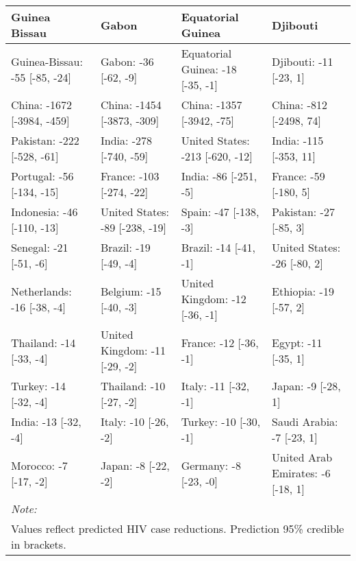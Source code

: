 \begin{table}
\centering
\begin{tabular}[t]{llll}
\toprule
Guinea Bissau & Gabon & Equatorial Guinea & Djibouti\\
\midrule
Guinea-Bissau: -55 [-85, -24] & Gabon: -36 [-62, -9] & Equatorial Guinea: -18 [-35, -1] & Djibouti: -11 [-23, 1]\\
China: -1672 [-3984, -459] & China: -1454 [-3873, -309] & China: -1357 [-3942, -75] & China: -812 [-2498, 74]\\
Pakistan: -222 [-528, -61] & India: -278 [-740, -59] & United States: -213 [-620, -12] & India: -115 [-353, 11]\\
Portugal: -56 [-134, -15] & France: -103 [-274, -22] & India: -86 [-251, -5] & France: -59 [-180, 5]\\
Indonesia: -46 [-110, -13] & United States: -89 [-238, -19] & Spain: -47 [-138, -3] & Pakistan: -27 [-85, 3]\\
Senegal: -21 [-51, -6] & Brazil: -19 [-49, -4] & Brazil: -14 [-41, -1] & United States: -26 [-80, 2]\\
Netherlands: -16 [-38, -4] & Belgium: -15 [-40, -3] & United Kingdom: -12 [-36, -1] & Ethiopia: -19 [-57, 2]\\
Thailand: -14 [-33, -4] & United Kingdom: -11 [-29, -2] & France: -12 [-36, -1] & Egypt: -11 [-35, 1]\\
Turkey: -14 [-32, -4] & Thailand: -10 [-27, -2] & Italy: -11 [-32, -1] & Japan: -9 [-28, 1]\\
India: -13 [-32, -4] & Italy: -10 [-26, -2] & Turkey: -10 [-30, -1] & Saudi Arabia: -7 [-23, 1]\\
Morocco: -7 [-17, -2] & Japan: -8 [-22, -2] & Germany: -8 [-23, -0] & United Arab Emirates: -6 [-18, 1]\\
\bottomrule
\multicolumn{4}{l}{\rule{0pt}{1em}\textit{Note: }}\\
\multicolumn{4}{l}{\rule{0pt}{1em}Values reflect predicted HIV case reductions. Prediction 95\% credible in brackets.}\\
\end{tabular}
\end{table}
